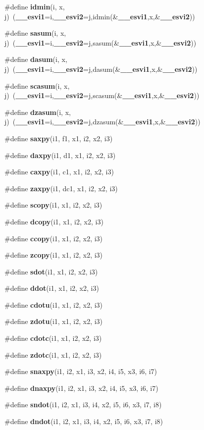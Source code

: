 \begin{CompactItemize}
\item 
\#define {\bf idmin}(i, x, j)~({\bf \_\-\_\-esvi1}=i,{\bf \_\-\_\-esvi2}=j,idmin(\&{\bf \_\-\_\-esvi1},x,\&{\bf \_\-\_\-esvi2}))
\item 
\#define {\bf sasum}(i, x, j)~({\bf \_\-\_\-esvi1}=i,{\bf \_\-\_\-esvi2}=j,sasum(\&{\bf \_\-\_\-esvi1},x,\&{\bf \_\-\_\-esvi2}))
\item 
\#define {\bf dasum}(i, x, j)~({\bf \_\-\_\-esvi1}=i,{\bf \_\-\_\-esvi2}=j,dasum(\&{\bf \_\-\_\-esvi1},x,\&{\bf \_\-\_\-esvi2}))
\item 
\#define {\bf scasum}(i, x, j)~({\bf \_\-\_\-esvi1}=i,{\bf \_\-\_\-esvi2}=j,scasum(\&{\bf \_\-\_\-esvi1},x,\&{\bf \_\-\_\-esvi2}))
\item 
\#define {\bf dzasum}(i, x, j)~({\bf \_\-\_\-esvi1}=i,{\bf \_\-\_\-esvi2}=j,dzasum(\&{\bf \_\-\_\-esvi1},x,\&{\bf \_\-\_\-esvi2}))
\item 
\#define {\bf saxpy}(i1, f1, x1, i2, x2, i3)
\item 
\#define {\bf daxpy}(i1, d1, x1, i2, x2, i3)
\item 
\#define {\bf caxpy}(i1, c1, x1, i2, x2, i3)
\item 
\#define {\bf zaxpy}(i1, dc1, x1, i2, x2, i3)
\item 
\#define {\bf scopy}(i1, x1, i2, x2, i3)
\item 
\#define {\bf dcopy}(i1, x1, i2, x2, i3)
\item 
\#define {\bf ccopy}(i1, x1, i2, x2, i3)
\item 
\#define {\bf zcopy}(i1, x1, i2, x2, i3)
\item 
\#define {\bf sdot}(i1, x1, i2, x2, i3)
\item 
\#define {\bf ddot}(i1, x1, i2, x2, i3)
\item 
\#define {\bf cdotu}(i1, x1, i2, x2, i3)
\item 
\#define {\bf zdotu}(i1, x1, i2, x2, i3)
\item 
\#define {\bf cdotc}(i1, x1, i2, x2, i3)
\item 
\#define {\bf zdotc}(i1, x1, i2, x2, i3)
\item 
\#define {\bf snaxpy}(i1, i2, x1, i3, x2, i4, i5, x3, i6, i7)
\item 
\#define {\bf dnaxpy}(i1, i2, x1, i3, x2, i4, i5, x3, i6, i7)
\item 
\#define {\bf sndot}(i1, i2, x1, i3, i4, x2, i5, i6, x3, i7, i8)
\item 
\#define {\bf dndot}(i1, i2, x1, i3, i4, x2, i5, i6, x3, i7, i8)
\item 

\end{CompactItemize}
